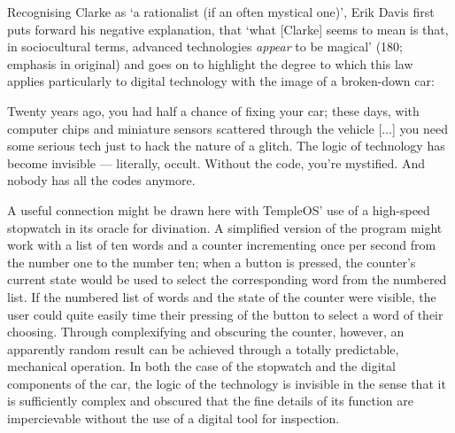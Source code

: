 \documentclass[Draft.tex]{subfiles}
\begin{document}
Recognising Clarke as `a rationalist (if an often mystical one)',
Erik Davis first puts forward his negative explanation, that
`what [Clarke] seems to mean is that, in sociocultural terms, advanced
technologies \textit{appear} to be magical' (180; emphasis in original)
and goes on to highlight the degree to which this law applies particularly
to digital technology with the image of a broken-down car:
\begin{displayquote}
  Twenty years ago, you had half a chance of fixing your car; these days,
  with computer chips and miniature sensors scattered through the vehicle
  [...] you need some serious tech just to hack the nature of a glitch.
  The logic of technology has become invisible --- literally, occult.
  Without the code, you're mystified.
  And nobody has all the codes anymore.
\end{displayquote}
A useful connection might be drawn here with TempleOS' use of a high-speed
stopwatch in its oracle for divination.
A simplified version of the program might work with a list of ten words
and a counter incrementing once per second from the number one to the number
ten; when a button is pressed, the counter's current state would be used to
select the corresponding word from the numbered list.
If the numbered list of words and the state of the counter were visible,
the user could quite easily time their pressing of the button to select
a word of their choosing.
Through complexifying and obscuring the counter, however, an apparently
random result can be achieved through a totally predictable,
mechanical operation.
In both the case of the stopwatch and the digital components of the car,
the logic of the technology is invisible in the sense that
it is sufficiently complex and obscured that the fine details of
its function are impercievable without
the use of a digital tool for inspection.
\end{document}
